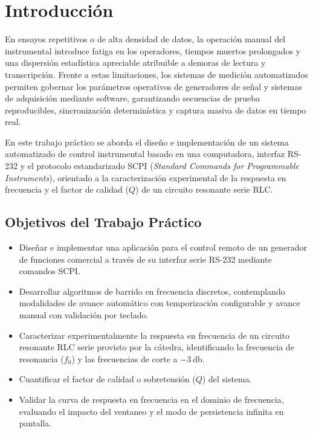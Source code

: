 \chapter{Introducción}

En ensayos repetitivos o de alta densidad de datos, la operación manual del instrumental introduce
fatiga en los operadores, tiempos muertos prolongados y una dispersión estadística apreciable atribuible a demoras de
lectura y transcripción. Frente a estas limitaciones, los sistemas de medición automatizados permiten gobernar los
parámetros operativos de generadores de señal y sistemas de adquisición mediante software, garantizando secuencias de
prueba reproducibles, sincronización determinística y captura masiva de datos en tiempo real.

En este trabajo práctico se aborda el diseño e implementación de un sistema automatizado de control instrumental basado
en una computadora, interfaz RS-232 y el protocolo estandarizado SCPI (\emph{Standard Commands for Programmable
Instruments}), orientado a la caracterización experimental de la respuesta en frecuencia y el factor de calidad ($Q$) de
un circuito resonante serie RLC.

\section{Objetivos del Trabajo Práctico}
\begin{itemize}
    \item Diseñar e implementar una aplicación para el control remoto de un generador de funciones
    comercial a través de su interfaz serie RS-232 mediante comandos SCPI.
    \item Desarrollar algoritmos de barrido en frecuencia discretos, contemplando modalidades de avance automático
    con temporización configurable y avance manual con validación por teclado.
    \item Caracterizar experimentalmente la respuesta en frecuencia de un circuito resonante RLC serie provisto por la
    cátedra, identificando la frecuencia de resonancia ($f_0$) y las frecuencias de corte a $\qty{-3}{\decibel}$.
    \item Cuantificar el factor de calidad o sobretensión ($Q$) del sistema.
    \item Validar la curva de respuesta en frecuencia en el dominio de frecuencia, evaluando el impacto del ventaneo y
    el modo de persistencia infinita en pantalla.
\end{itemize}

